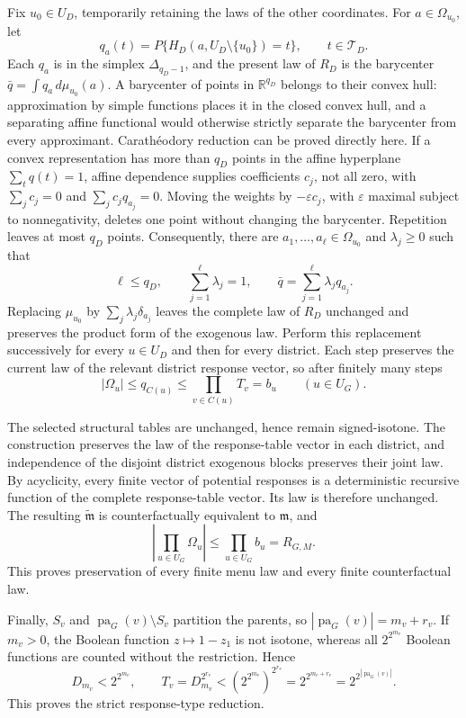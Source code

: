 Fix \(u_0\in U_D\), temporarily retaining the laws of the other coordinates.  For \(a\in\Omega_{u_0}\), let
\[
 q_a(t)=P\{H_D(a,U_D\setminus\{u_0\})=t\},
 \qquad t\in\mathcal T_D.
\]
Each \(q_a\) is in the simplex \(\Delta_{q_D-1}\), and the present law of \(R_D\) is the barycenter \(\bar q=\int q_a\,d\mu_{u_0}(a)\).  A barycenter of points in \(\mathbb R^{q_D}\) belongs to their convex hull: approximation by simple functions places it in the closed convex hull, and a separating affine functional would otherwise strictly separate the barycenter from every approximant.  Carath\'eodory reduction can be proved directly here.  If a convex representation has more than \(q_D\) points in the affine hyperplane \(\sum_t q(t)=1\), affine dependence supplies coefficients \(c_j\), not all zero, with \(\sum_jc_j=0\) and \(\sum_jc_jq_{a_j}=0\).  Moving the weights by \(-\varepsilon c_j\), with \(\varepsilon\) maximal subject to nonnegativity, deletes one point without changing the barycenter.  Repetition leaves at most \(q_D\) points.  Consequently, there are \(a_1,\ldots,a_\ell\in\Omega_{u_0}\) and \(\lambda_j\ge0\) such that
\[
 \ell\le q_D,\qquad \sum_{j=1}^{\ell}\lambda_j=1,
 \qquad \bar q=\sum_{j=1}^{\ell}\lambda_jq_{a_j}.
\]
Replacing \(\mu_{u_0}\) by \(\sum_j\lambda_j\delta_{a_j}\) leaves the complete law of \(R_D\) unchanged and preserves the product form of the exogenous law.  Perform this replacement successively for every \(u\in U_D\) and then for every district.  Each step preserves the current law of the relevant district response vector, so after finitely many steps
\[
 |\Omega_u|\le q_{C(u)}\le\prod_{v\in C(u)}T_v=b_u
 \qquad (u\in U_G).
\]

The selected structural tables are unchanged, hence remain signed-isotone.  The construction preserves the law of the response-table vector in each district, and independence of the disjoint district exogenous blocks preserves their joint law.  By acyclicity, every finite vector of potential responses is a deterministic recursive function of the complete response-table vector.  Its law is therefore unchanged.  The resulting \(\widetilde{\mathfrak m}\) is counterfactually equivalent to \(\mathfrak m\), and
\[
 \left|\prod_{u\in U_G}\Omega_u\right|
 \le\prod_{u\in U_G}b_u=R_{G,M}.
\]
This proves preservation of every finite menu law and every finite counterfactual law.

Finally, \(S_v\) and \(\operatorname{pa}_G(v)\setminus S_v\) partition the parents, so \(|\operatorname{pa}_G(v)|=m_v+r_v\).  If \(m_v>0\), the Boolean function \(z\mapsto1-z_1\) is not isotone, whereas all \(2^{2^{m_v}}\) Boolean functions are counted without the restriction.  Hence
\[
 D_{m_v}<2^{2^{m_v}},
 \qquad
 T_v=D_{m_v}^{2^{r_v}}
 <\left(2^{2^{m_v}}\right)^{2^{r_v}}
 =2^{2^{m_v+r_v}}
 =2^{2^{|\operatorname{pa}_G(v)|}}.
\]
This proves the strict response-type reduction.